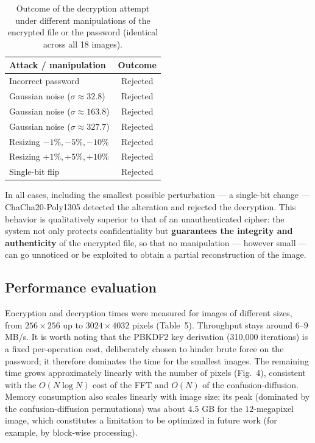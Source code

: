 \documentclass{llncs}
\begin{document}
\begin{table}[htbp]
  \centering
  \caption{Outcome of the decryption attempt under different manipulations of
  the encrypted file or the password (identical across all 18 images).}
  \begin{tabular}{@{}lc@{}}
    \toprule
    \textbf{Attack / manipulation} & \textbf{Outcome} \\
    \midrule
    Incorrect password                        & Rejected \\
    Gaussian noise ($\sigma \approx 32.8$)     & Rejected \\
    Gaussian noise ($\sigma \approx 163.8$)    & Rejected \\
    Gaussian noise ($\sigma \approx 327.7$)    & Rejected \\
    Resizing $-1\%, -5\%, -10\%$               & Rejected \\
    Resizing $+1\%, +5\%, +10\%$               & Rejected \\
    Single-bit flip                            & Rejected \\
    \bottomrule
  \end{tabular}
\end{table}
\FloatBarrier

In all cases, including the smallest possible perturbation --- a single-bit
change --- ChaCha20-Poly1305 detected the alteration and rejected the
decryption. This behavior is qualitatively superior to that of an
unauthenticated cipher: the system not only protects confidentiality but
\textbf{guarantees the integrity and authenticity} of the encrypted file, so
that no manipulation --- however small --- can go unnoticed or be exploited
to obtain a partial reconstruction of the image.

\subsection{Performance evaluation}

Encryption and decryption times were measured for images of different sizes,
from $256\times256$ up to $3024\times4032$ pixels (Table~5). Throughput stays
around $6$--$9$ MB/s. It is worth noting that the PBKDF2 key derivation
(310{,}000 iterations) is a fixed per-operation cost, deliberately chosen to
hinder brute force on the password; it therefore dominates the time for the
smallest images. The remaining time grows approximately linearly with the
number of pixels (Fig.~4), consistent with the $O(N\log N)$ cost of the FFT
and $O(N)$ of the confusion-diffusion. Memory consumption also scales linearly
with image size; its peak (dominated by the confusion-diffusion permutations)
was about $4.5$ GB for the $12$-megapixel image, which constitutes a
limitation to be optimized in future work (for example, by block-wise
processing).
\end{document}
